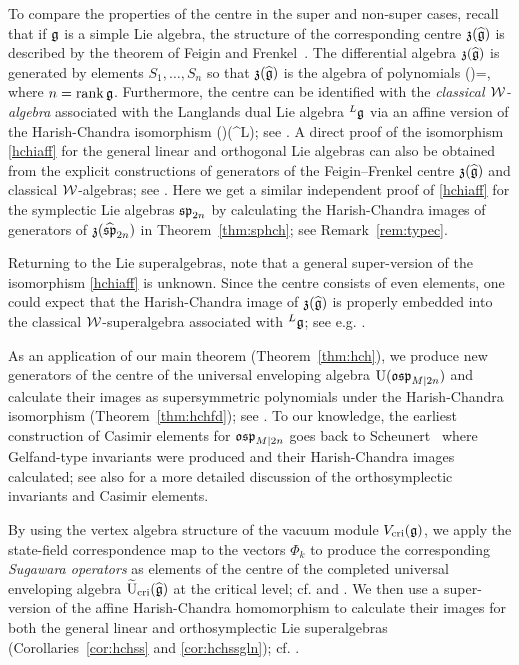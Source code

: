 \documentclass[12pt]{article}
\begin{document}
To compare the properties of the centre in the super and non-super cases, recall that
if $\mathfrak{g}$ is a simple Lie algebra, the structure of the corresponding centre $\mathfrak{z}(\widehat{\mathfrak{g}})$
is described by the theorem of Feigin and Frenkel~\cite{ff:ak}.
The differential algebra
$\mathfrak{z}(\widehat{\mathfrak{g}})$ is generated by elements
$S_1,\dots,S_n$ so that
$\mathfrak{z}(\widehat{\mathfrak{g}})$ is the algebra of polynomials
\ben
\z(\wh\g)=\CC[\tau^{\tss r}S_l\ |\ l=1,\dots,n,\ \ r\geqslant 0],
\een
where $n=\text{rank}\,\mathfrak{g}$. Furthermore,
the centre can be identified
with the {\em classical ${\mathcal W}$-algebra}
associated with the Langlands dual Lie algebra ${}^L\mathfrak{g}$
via an affine version of the Harish-Chandra isomorphism
\z(\wh\g)\cong \Wc({}^L\g);
\eeq
see \cite{f:lc}. A direct proof of the isomorphism \eqref{hchiaff}
for the general linear and orthogonal Lie algebras
can also be obtained from the explicit constructions of generators
of the Feigin--Frenkel centre $\mathfrak{z}(\widehat{\mathfrak{g}})$
and classical ${\mathcal W}$-algebras; see \cite[Sec.~13.1]{m:so}.
Here we get a similar independent proof of \eqref{hchiaff}
for the symplectic Lie algebras $\mathfrak{sp}_{2n}$
by calculating the Harish-Chandra images of generators of $\mathfrak{z}(\widehat{\mathfrak{sp}}_{2n})$
in Theorem~\ref{thm:sphch}; see Remark~\ref{rem:typec}.

Returning to the Lie superalgebras, note that a general super-version of the
isomorphism \eqref{hchiaff} is unknown. Since the centre consists of even elements,
one could expect that the Harish-Chandra image of $\mathfrak{z}(\widehat{\mathfrak{g}})$ is properly embedded into
the classical ${\mathcal W}$-superalgebra associated with ${}^L\mathfrak{g}$; see e.g. \cite{s:ca}.

As an application of our main theorem (Theorem~\ref{thm:hch}), we produce new generators of the centre
of the universal enveloping algebra ${\rm U}(\mathfrak{osp}_{M|2n})$ and calculate their images
as supersymmetric polynomials under the
Harish-Chandra isomorphism (Theorem~\ref{thm:hchfd});
see \cite[Sec.~2.2]{cw:dr}. To our knowledge, the earliest
construction of Casimir elements for $\mathfrak{osp}_{M|2n}$ goes back to Scheunert~\cite{s:ec}
where Gelfand-type invariants were produced and their Harish-Chandra images
calculated; see also \cite{lw:sw} for a more detailed discussion of
the orthosymplectic invariants and Casimir elements.

By using the vertex algebra structure of the vacuum module $V_{{\rm cri}}(\mathfrak{g})$,
we apply the state-field correspondence map to the vectors $\Phi_k$
to produce the corresponding {\em Sugawara operators}
as elements of the centre of the completed universal enveloping algebra
$\widetilde{{\rm U}}_{{\rm cri}}(\widehat{\mathfrak{g}})$ at the critical level; cf. \cite[Sec.~4.3]{f:lc} and \cite[Secs~7.2, 8.5]{m:so}.
We then use a super-version of the affine Harish-Chandra homomorphism to
calculate their images for both the general linear and orthosymplectic
Lie superalgebras (Corollaries~\ref{cor:hchss} and \ref{cor:hchssgln});
cf. \cite[Sec.~13.3]{m:so}.
\end{document}
